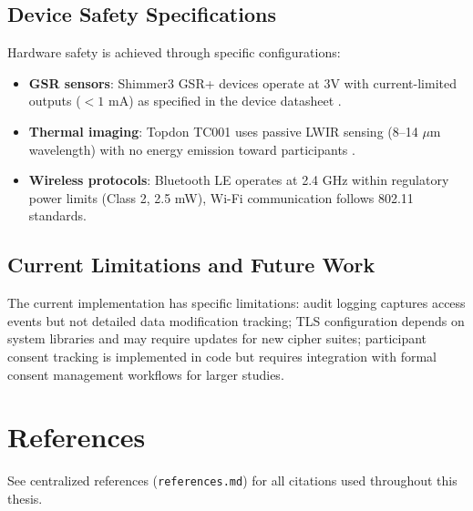 \subsection{Device Safety Specifications}
Hardware safety is achieved through specific configurations:
\begin{itemize}
  \item \textbf{GSR sensors}: Shimmer3 GSR+ devices operate at 3V with current-limited outputs ($<1$ mA) as specified in the device datasheet \citep{ref8}.
  \item \textbf{Thermal imaging}: Topdon TC001 uses passive LWIR sensing (8--14 $\mu$m wavelength) with no energy emission toward participants \citep{ref16}.
  \item \textbf{Wireless protocols}: Bluetooth LE operates at 2.4 GHz within regulatory power limits (Class 2, 2.5 mW), Wi-Fi communication follows 802.11 standards.
\end{itemize}

\subsection{Current Limitations and Future Work}
The current implementation has specific limitations: audit logging captures access events but not detailed data modification tracking; TLS configuration depends on system libraries and may require updates for new cipher suites; participant consent tracking is implemented in code but requires integration with formal consent management workflows for larger studies.

\section*{References}
See centralized references (\texttt{references.md}) for all citations used throughout this thesis. %
